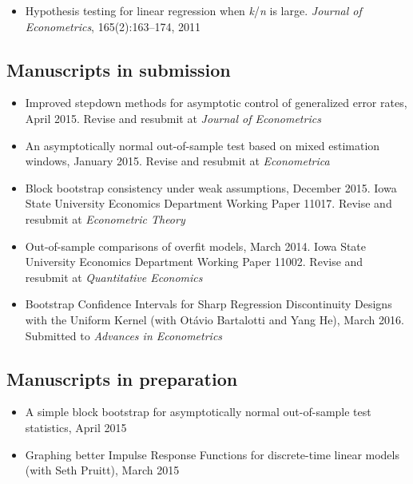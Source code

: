 \documentclass[12pt]{article}%
\begin{document}
\begin{itemize}
\item Hypothesis testing for linear regression when
\textit{k}/\textit{n} is large. \textit{Journal of Econometrics},
165(2):163--174, 2011
\end{itemize}

\subsection*{Manuscripts in submission}

\begin{itemize}
\item Improved stepdown methods for asymptotic control of generalized
error rates, April 2015. Revise and resubmit at \textit{Journal of
Econometrics}
\item An asymptotically normal out-of-sample test based on mixed
estimation windows, January 2015. Revise and resubmit at
\textit{Econometrica}
\item Block bootstrap consistency under weak assumptions, December
2015.  Iowa State University Economics Department Working Paper
11017. Revise and resubmit at \textit{Econometric Theory}
\item Out-of-sample comparisons of overfit models, March 2014. Iowa
State University Economics Department Working Paper 11002. Revise and
resubmit at \textit{Quantitative Economics}
\item Bootstrap Confidence Intervals for Sharp Regression
Discontinuity Designs with the Uniform Kernel (with Ot\'avio Bartalotti
and Yang He), March 2016. Submitted to \textit{Advances in Econometrics}
\end{itemize}

\subsection*{Manuscripts in preparation}
\begin{itemize}
\item A simple block bootstrap for asymptotically normal out-of-sample
  test statistics, April 2015
\item Graphing better Impulse Response Functions for discrete-time
  linear models (with Seth Pruitt), March 2015
\end{itemize}
\end{document}
